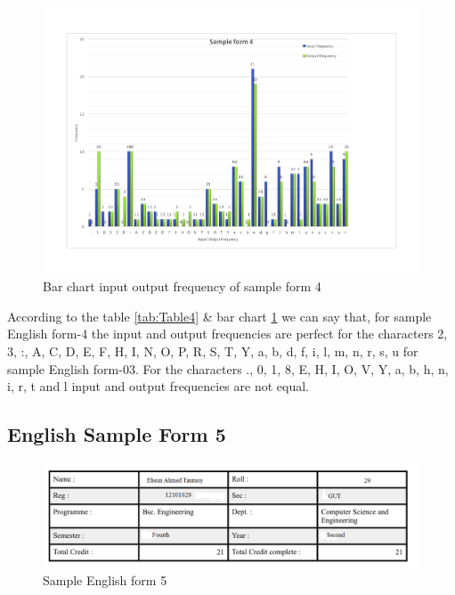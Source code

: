 \begin{figure}[H]
\centering
\includegraphics[width=1\textwidth]{form4.pdf}
\caption {Bar chart input output frequency of sample form 4}
\label {fig:bar4}
\end{figure}

According to the table \ref{tab:Table4} \& bar chart \ref{fig:bar4} we can say that, for sample English form-4 the input and output frequencies are perfect for the characters 2, 3, :, A, C, D, E, F, H, I, N, O, P, R, S, T, Y, a, b, d, f, i, l, m, n, r, s, u for sample English form-03. For the characters ., 0, 1, 8, E, H, I, O, V, Y, a, b, h, n, i, r, t and l input and output frequencies are not equal. 

\subsection{English Sample Form 5}
\begin{figure}[H]
\centering
\includegraphics[width=1\textwidth]{form5.png}
\caption {Sample English form 5}
\label {fig:form4}
\end{figure}

